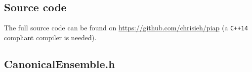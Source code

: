 \documentclass[11pt, a4paper]{article}
\numberwithin{equation}{section}
\begin{document}
\begin{appendix}
	\newpage
	\section{Source code}
	The full source code can be found on \url{https://github.com/chrisieh/piap} (a \texttt{C++14} compliant compiler is needed).
	\subsection{CanonicalEnsemble{.}h} \label{sec:canonical_ensemble_source}
	
\end{appendix}
\end{document}
